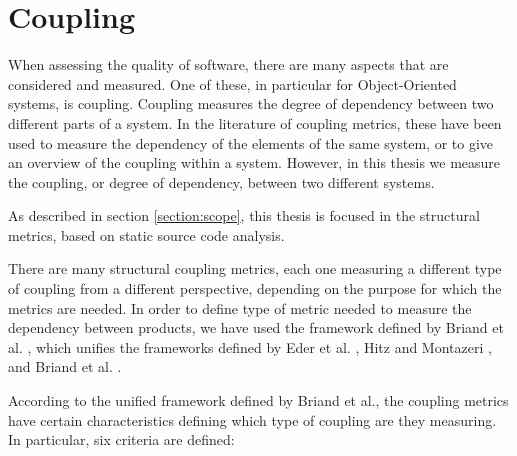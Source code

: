 \section{Coupling}
When assessing the quality of software, there are many aspects that are considered and measured. One of these, in particular for Object-Oriented systems, is coupling. Coupling measures the degree of dependency between two different parts of a system. In the literature of coupling metrics, these have been used to measure the dependency of the elements of the same system, or to give an overview of the coupling within a system. However, in this thesis we measure the coupling, or degree of dependency, between two different systems.

As described in section \ref{section:scope}, this thesis is focused in the structural metrics, based on static source code analysis.

There are many structural coupling metrics, each one measuring a different type of coupling from a different perspective, depending on the purpose for which the metrics are needed. In order to define type of metric needed to measure the dependency between products, we have used the framework defined by Briand et al. \cite{briand1999unified}, which unifies the frameworks defined by Eder et al. \cite{eder1994coupling}, Hitz and Montazeri \cite{hitz1995measuring}, and Briand et al. \cite{briand1997investigation}.

According to the unified framework defined by Briand et al., the coupling metrics have certain characteristics defining which type of coupling are they measuring. In particular, six criteria are defined:

